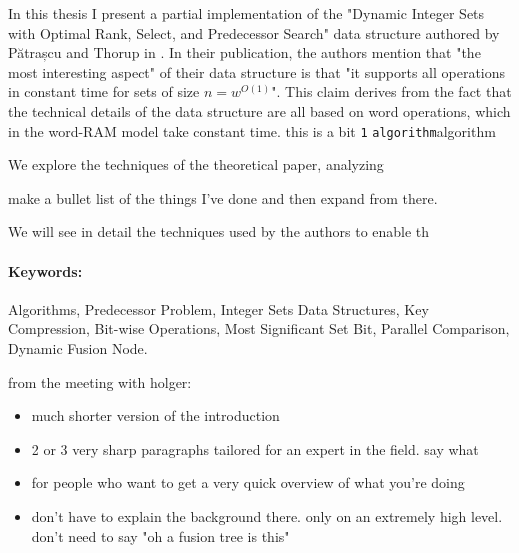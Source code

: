 

In this thesis I present a partial implementation of the "Dynamic Integer Sets with Optimal Rank, Select, and Predecessor Search" data structure authored by Pătrașcu and Thorup in \cite{patrascu2014dynamic}. In their publication, the authors mention that "the most interesting aspect" of their data structure is that "it supports all operations in constant time for sets of size $n = w^{O(1)}$". This claim derives from the fact that the technical details of the data structure are all based on word operations, which in the word-RAM model take constant time. this is a bit \texttt{1}{} \texttt{algorithm}{\ttfamily algorithm}

We explore the techniques of the theoretical paper, analyzing 

make a bullet list of the things I've done and then expand from there.

We will see in detail the techniques used by the authors to enable th

\paragraph*{Keywords:} Algorithms, Predecessor Problem, Integer Sets Data Structures, Key Compression, Bit-wise Operations, Most Significant Set Bit, Parallel Comparison, Dynamic Fusion Node.

from the meeting with holger:
\begin{itemize}
    \item
    much shorter version of the introduction
    
    \item
    2 or 3 very sharp paragraphs tailored for an expert in the field. say what 
    
    \item
    for people who want to get a very quick overview of what you're doing
    
    \item
    don't have to explain the background there. only on an extremely high level. don't need to say "oh a fusion tree is this"
\end{itemize}


